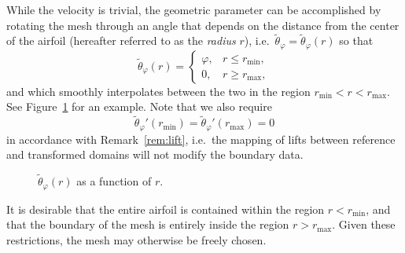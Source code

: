 \documentclass[onecolumn, twoside, a4paper, 11pt]{article}
\begin{document}
While the velocity is trivial, the geometric
parameter can be accomplished by rotating the mesh through an angle that depends
on the distance from the center of the airfoil (hereafter referred to as the
\emph{radius} $r$), i.e.~$\tilde{\theta}_\varphi = \tilde{\theta}_\varphi(r)$
so that
\[
  \tilde{\theta}_\varphi(r) = \begin{cases}
    \varphi, & r \le r_\text{min}, \\
    0, & r \ge r_\text{max},
  \end{cases}
\]
and which smoothly interpolates between the two in the region
$r_\text{min} < r < r_\text{max}$. See Figure~\ref{fig:thetatilde} for an
example. Note that we also require
\[
  \tilde{\theta}_\varphi'(r_\text{min}) =
  \tilde{\theta}_\varphi'(r_\text{max}) = 0
\]
%
in accordance with Remark~\ref{rem:lift}, i.e.~the mapping of lifts between reference and
transformed domains will not modify the boundary data.
%
\begin{figure}
  \begin{center}
  \end{center}
  \caption{$\tilde{\theta}_\varphi(r)$ as a function of $r$.}
  \label{fig:thetatilde}
\end{figure}
%
It is desirable that the entire airfoil is contained within the region $r <
r_\text{min}$, and that the boundary of the mesh is entirely inside the region
$r > r_\text{max}$. Given these restrictions, the mesh may otherwise be freely
chosen.
\end{document}
